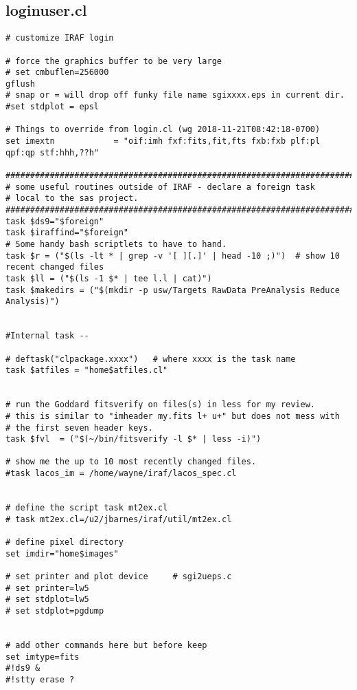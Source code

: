 \newpage
\subsection{loginuser.cl}

{\color{darkred}
\begingroup \fontsize{10pt}{10pt}
\selectfont
\begin{verbatim} 
# customize IRAF login

# force the graphics buffer to be very large
# set cmbuflen=256000
gflush
# snap or = will drop off funky file name sgixxxx.eps in current dir.
#set stdplot = epsl

# Things to override from login.cl (wg 2018-11-21T08:42:18-0700)
set	imextn		      = "oif:imh fxf:fits,fit,fts fxb:fxb plf:pl qpf:qp stf:hhh,??h"

#############################################################################
# some useful routines outside of IRAF - declare a foreign task
# local to the sas project.
#############################################################################
task $ds9="$foreign"
task $iraffind="$foreign"
# Some handy bash scriptlets to have to hand.
task $r = ("$(ls -lt * | grep -v '[ ][.]' | head -10 ;)")  # show 10 recent changed files
task $ll = ("$(ls -1 $* | tee l.l | cat)")
task $makedirs = ("$(mkdir -p usw/Targets RawData PreAnalysis Reduce Analysis)")


#Internal task -- 

# deftask("clpackage.xxxx")   # where xxxx is the task name
task $atfiles = "home$atfiles.cl"


# run the Goddard fitsverify on files(s) in less for my review.
# this is similar to "imheader my.fits l+ u+" but does not mess with
# the first seven header keys.
task $fvl  = ("$(~/bin/fitsverify -l $* | less -i)")

# show me the up to 10 most recently changed files.
#task lacos_im = /home/wayne/iraf/lacos_spec.cl 


# define the script task mt2ex.cl
# task mt2ex.cl=/u2/jbarnes/iraf/util/mt2ex.cl

# define pixel directory
set imdir="home$images"

# set printer and plot device     # sgi2ueps.c 
# set printer=lw5
# set stdplot=lw5
# set stdplot=pgdump


# add other commands here but before keep
set imtype=fits
#!ds9 &
#!stty erase ?


\end{verbatim}}
